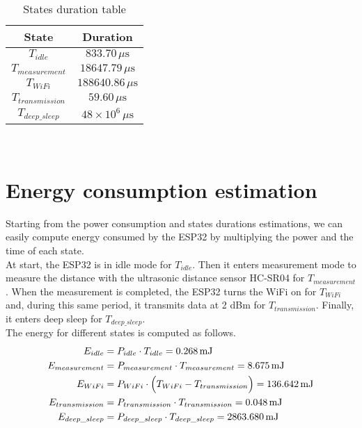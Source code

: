 \begin{table}[H]
\centering 
\begin{tabular}{| c | c |}
	\hline 
	\rowcolor{bluepoli!40}
	\textbf{State} & \textbf{Duration}\T\B \\
	\hline 
	$T_{idle}$ & $833.70\,\mu\text{s}$ \T\B\\
	$T_{measurement}$ & $18647.79\,\mu\text{s}$ \T\B\\
	$T_{WiFi}$ & $188640.86\,\mu\text{s}$ \T\B\\
	$T_{transmission}$ & $59.60\,\mu\text{s}$ \T\B\\
	$T_{deep\_sleep}$  & $48\times10^6\,\mu\text{s}$ \T\B\\
	\hline
\end{tabular}
\\[10pt]
\caption{States duration table}
\label{table:states_duration_table}
\end{table}

\section{Energy consumption estimation}
Starting from the power consumption and states durations estimations, we can easily compute energy consumed by the ESP32 by multiplying the power and the time of each state.\\
At start, the ESP32 is in idle mode for $T_{idle}$. Then it enters measurement mode to measure the distance with the ultrasonic distance sensor HC-SR04 for $T_{measurement}$. When the measurement is completed, the ESP32 turns the WiFi on for $T_{WiFi}$ and, during this same period, it transmits data at 2 dBm for $T_{transmission}$. Finally, it enters deep sleep for $T_{deep\_sleep}$. \\

The energy for different states is computed as follows.
\begin{align*}
	E_{idle} &= P_{idle} \cdot T_{idle} = 0.268 \,\text{mJ} \\ 
	E_{measurement} &= P_{measurement} \cdot T_{measurement} = 8.675 \,\text{mJ} \\
	E_{WiFi} &= P_{WiFi} \cdot \Bigl(T_{WiFi} - T_{transmission} \Bigr) = 136.642\,\text{mJ} \\
	E_{transmission} &= P_{transmission} \cdot T_{transmission} = 0.048\,\text{mJ} \\
   	E_{deep\_sleep} &= P_{deep\_sleep} \cdot T_{deep\_sleep} = 2863.680\,\text{mJ} 
\end{align*}

